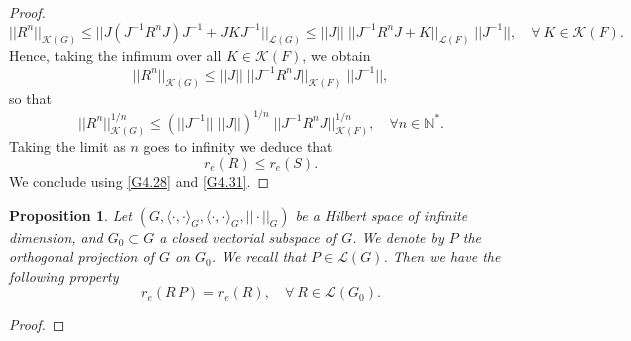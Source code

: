 \documentclass[10pt, english]{article}
\newtheorem{prop}[thm]{Proposition}
\begin{document}
{\begin{proof}
\begin{equation}\label{G4.29}%
||R^n||_{\mathcal{K}(G)} \leqslant || J(J^{-1}R^n J)J^{-1} + JKJ^{-1}||_{\mathcal{L}(G)} \leqslant ||J||\; || J^{-1}R^nJ +K ||_{\mathcal{L}(F)}\; ||J^{-1}||, \quad \forall \ K \in \mathcal{K}(F).
\end{equation}
Hence, taking the infimum over all $K \in \mathcal{K}(F)$, we obtain
\begin{equation}\label{G4.30}%
||R^n||_{\mathcal{K}(G)} \leqslant ||J||\; ||J^{-1}R^nJ ||_{\mathcal{K}(F)}\; ||J^{-1}||,
\end{equation}
so that
\begin{equation}\label{Gb4.30}%
||R^n||_{\mathcal{K}(G)}^{1/n} \leqslant (||J^{-1}||\; ||J|| )^{1/n}\;  ||J^{-1}R^nJ ||_{\mathcal{K}(F)}^{1/n}, \quad \forall n \in \mathbb{N}^{\ast}.
\end{equation}
Taking the limit as $n$ goes to infinity we deduce that
\begin{equation}\label{G4.31}%
r_e(R) \leqslant r_e(S).
\end{equation}
We conclude using \eqref{G4.28} and \eqref{G4.31}.
\end{proof}

\begin{prop}\label{UptoPi}
Let $(G, \langle\cdot,\cdot\rangle_G, \langle \cdot,\cdot \rangle_G, ||\cdot||_G)$  be a Hilbert space of infinite dimension, and $G_0 \subset G$ a closed vectorial subspace of $G$. We denote by $P$ the orthogonal projection of $G$ on $G_0$.  We recall that $P \in \mathcal{L}(G)$. Then we have the following property
\begin{equation}\label{PIradius}
r_e(R\,P)=r_e(R), \quad \forall \ R \in \mathcal{L}(G_0).
\end{equation}
\end{prop}
\begin{proof}


\end{proof}}
\end{document}
